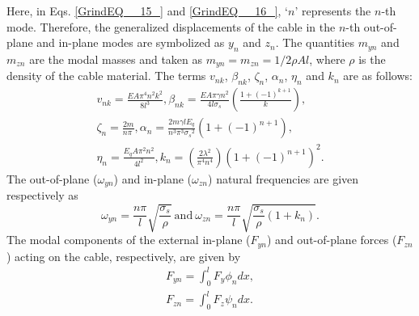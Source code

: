 \documentclass[review]{elsarticle}
\begin{document}
Here, in Eqs. \eqref{GrindEQ__15_} and \eqref{GrindEQ__16_}, `$n$' represents the $n$-th mode. Therefore, the generalized displacements of the cable in the $n$-th out-of-plane and in-plane modes are symbolized as $y_{n}$ and $z_{n}$. The quantities $m_{yn}$ and $m_{zn}$ are the modal masses and taken as $m_{yn}=m_{zn}=1/2\rho Al$, where $\rho $ is the density of the cable material. The terms $v_{nk}$, $\beta_{nk}$, $\zeta_n$, $\alpha_n$, $\eta_n$ and $k_n$ are as follows: 
\begin{equation} \label{GrindEQ__17_} 
\begin{split}
v_{nk}=\frac{EA{\pi }^4n^2k^2}{8l^3}, {\beta }_{nk}=\frac{EA\pi \gamma n^2}{4l{\sigma }_s}\left(\frac{1+{\left(-1\right)}^{k+1}}{k}\right),\\
{\zeta }_n=\frac{2m}{n\pi \ }, {\alpha }_n=\frac{2m\gamma lE_q}{n^3{\pi }^3{{\sigma }_s}^2}\left(1+{\left(-1\right)}^{n+1}\right),\\
{\eta }_n=\frac{E_qA{\pi }^2n^2}{4l^2}, k_n=\left(\frac{2{\lambda }^2}{{\pi }^4n^4}\right){\left(1+{\left(-1\right)}^{n+1}\right)}^2. 
\end{split}        
\end{equation} 
The out-of-plane ($\omega_{yn}$) and in-plane ($\omega_{zn}$) natural frequencies are given respectively as
\begin{equation} \label{GrindEQ__18_} 
{\omega }_{yn}=\frac{n\pi }{l}\sqrt{\frac{{\sigma }_s}{\rho }} ~\mbox{and}~ {\omega }_{zn}=\frac{n\pi }{l}\sqrt{\frac{{\sigma }_s}{\rho }\left(1+k_n\right)}.
\end{equation} 
The modal components of the external in-plane ($F_{yn}$) and out-of-plane forces ($F_{zn}$) acting on the cable, respectively, are given by
\begin{equation} \label{GrindEQ__19_} 
\begin{split}
F_{yn}=\int^l_0{F_y{\phi }_ndx},\\
F_{zn}=\int^l_0{F_z{\psi }_ndx}.    
\end{split}        
\end{equation} 

\end{document}
